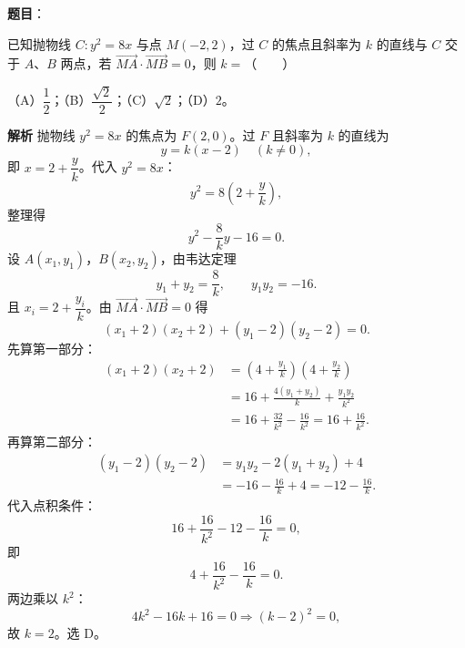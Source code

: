 \begin{answer}

\textbf{题目}：

已知抛物线 $C:y^2=8x$ 与点 $M(-2,2)$，过 $C$ 的焦点且斜率为 $k$ 的直线与 $C$ 交于 $A$、$B$ 两点，若 $\overrightarrow{MA}\cdot\overrightarrow{MB}=0$，则 $k=$\mbox{（　　）}

（A）$\dfrac12$；（B）$\dfrac{\sqrt2}2$；（C）$\sqrt2$；（D）$2$。

\textbf{解析}
抛物线 $y^2=8x$ 的焦点为 $F(2,0)$。过 $F$ 且斜率为 $k$ 的直线为
\nopagebreak[4]
\[y=k(x-2)\quad(k\neq0),\]
即 $x=2+\dfrac yk$。代入 $y^2=8x$：
\nopagebreak[4]
\[y^2=8\left(2+\frac yk\right),\]
整理得
\nopagebreak[4]
\[y^2-\frac8k y-16=0.\]
设 $A(x_1,y_1)$，$B(x_2,y_2)$，由韦达定理
\nopagebreak[4]
\[y_1+y_2=\frac8k,\qquad y_1y_2=-16.\]
且 $x_i=2+\dfrac{y_i}{k}$。由 $\overrightarrow{MA}\cdot\overrightarrow{MB}=0$ 得
\nopagebreak[4]
\[(x_1+2)(x_2+2)+(y_1-2)(y_2-2)=0.\]
先算第一部分：
\nopagebreak[4]
\[\begin{aligned}
(x_1+2)(x_2+2)
&=\left(4+\frac{y_1}{k}\right)\left(4+\frac{y_2}{k}\right)\\
&=16+\frac{4(y_1+y_2)}{k}+\frac{y_1y_2}{k^2}\\
&=16+\frac{32}{k^2}-\frac{16}{k^2}
=16+\frac{16}{k^2}.
\end{aligned}\]
再算第二部分：
\nopagebreak[4]
\[\begin{aligned}
(y_1-2)(y_2-2)
&=y_1y_2-2(y_1+y_2)+4\\
&=-16-\frac{16}{k}+4
=-12-\frac{16}{k}.
\end{aligned}\]
代入点积条件：
\nopagebreak[4]
\[16+\frac{16}{k^2}-12-\frac{16}{k}=0,\]
即
\nopagebreak[4]
\[4+\frac{16}{k^2}-\frac{16}{k}=0.\]
两边乘以 $k^2$：
\nopagebreak[4]
\[4k^2-16k+16=0
\Longrightarrow (k-2)^2=0,\]
故 $k=2$。选 D。


\end{answer}
